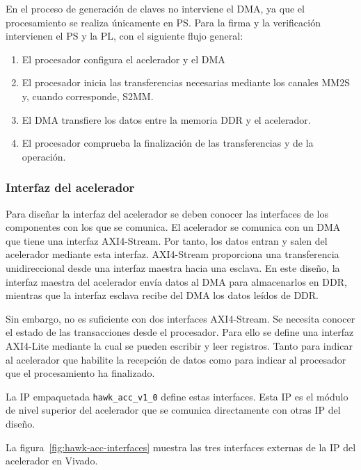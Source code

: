 En el proceso de generación de claves no interviene el DMA, ya que
el procesamiento se realiza únicamente en PS. 
Para la firma y la verificación intervienen el PS y la PL, con el siguiente flujo general:
\begin{enumerate}
    \item El procesador configura el acelerador y el DMA
    \item El procesador inicia las transferencias necesarias
    mediante los canales MM2S y, cuando corresponde, S2MM.
    \item El DMA transfiere los datos entre la memoria DDR
    y el acelerador.
    \item El procesador comprueba la finalización de las
    transferencias y de la operación.
\end{enumerate}

\subsubsection{Interfaz del acelerador}

Para diseñar la interfaz del acelerador se deben conocer
las interfaces de los componentes con los que se comunica.
El acelerador se comunica con un DMA que tiene una interfaz AXI4-Stream.
Por tanto, los datos entran y salen del acelerador mediante esta interfaz.
AXI4-Stream proporciona una transferencia unidireccional desde una interfaz 
maestra hacia una esclava. En este diseño, la interfaz maestra del acelerador 
envía datos al DMA para almacenarlos en DDR, mientras que la interfaz esclava 
recibe del DMA los datos leídos de DDR.

Sin embargo, no es suficiente con dos interfaces AXI4-Stream. Se necesita conocer
el estado de las transacciones desde el procesador. Para ello se define una interfaz
AXI4-Lite mediante la cual se pueden escribir y leer registros. Tanto para indicar
al acelerador que habilite la recepción de datos como para indicar al procesador que
el procesamiento ha finalizado.

La IP empaquetada \texttt{hawk\_acc\_v1\_0} define estas interfaces. Esta IP
es el módulo de nivel superior del acelerador 
que se comunica directamente con otras IP del diseño.

La figura~\ref{fig:hawk-acc-interfaces} muestra las tres interfaces
externas de la IP del acelerador en Vivado.

